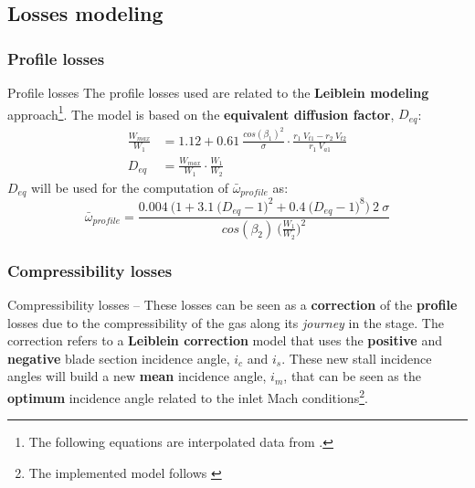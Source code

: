 \subsection{Losses modeling}
\subsubsection{Profile losses}
	\begin{frame}{Profile losses}
		The profile losses used are related to the \textbf{Leiblein modeling} approach\footnote{The following equations are interpolated data from \cite[Sec. 6.4]{axial2004}.}.
		\newline
		The model is based on the \textbf{equivalent diffusion factor}, $D_{eq}$:
		\begin{align}
			\frac{W_{max}}{W_1} & = 1.12 + 0.61 \ \frac{cos(\beta_1)^2}{\sigma} \cdot \frac{r_1 \ V_{t1} - r_2 \ V_{t2}}{r_1 \ V_{a1}} \nonumber \\
			D_{eq} & = \frac{W_{max}}{W_1} \cdot \frac{W_1}{W_2} \nonumber  
		\end{align}
		$D_{eq}$ will be used for the computation of $\bar{\omega}_{profile}$ as:
		\begin{equation}
			\bar{\omega}_{profile} = \frac{0.004 \ \Big( 1 + 3.1 \ \big( D_{eq} - 1 \big)^2 + 0.4 \ \big( D_{eq} - 1 \big)^8 \Big) \ 2 \ \sigma}{cos(\beta_2) \ \Big( \frac{W_1}{W_2} \Big)^2} \nonumber
		\end{equation}
	\end{frame}

\subsubsection{Compressibility losses}
	\begin{frame}{Compressibility losses -- }
		 These losses can be seen as a \textbf{correction} of the \textbf{profile} losses due to the compressibility of the gas along its \textit{journey} in the stage. 
		 \newline
		 \newline
		 The correction refers to a \textbf{Leiblein correction} model that uses the \textbf{positive} and \textbf{negative} blade section incidence angle, $i_c$ and $i_s$. 
		 \newline
		 \newline
		 These new stall incidence angles will build a new \textbf{mean} incidence angle, $i_m$, that can be seen as the \textbf{optimum} incidence angle related to the inlet Mach conditions\footnote{The implemented model follows \cite[Sec. 6.6]{axial2004}}. 
	\end{frame}

